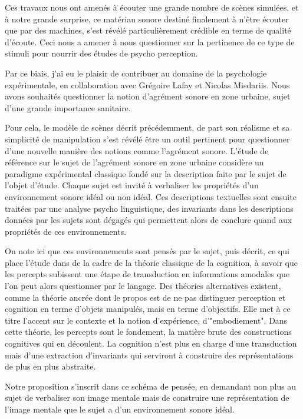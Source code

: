   Ces travaux nous ont amenés à écouter une grande nombre de scènes simulées, et à notre grande surprise, ce matériau sonore destiné finalement à n'être écouter que par des machines, s'est révélé particulièrement crédible en terme de qualité d'écoute. Ceci nous a amener à nous questionner sur la pertinence de ce type de stimuli pour nourrir des études de psycho perception.

  Par ce biais, j'ai eu le plaisir de contribuer au domaine de la psychologie expérimentale, en collaboration avec Grégoire Lafay et Nicolas Misdariis. Nous avons souhaités questionner la notion d'agrément sonore en zone urbaine, sujet d'une grande importance sanitaire.

  Pour cela, le modèle de scènes décrit précédemment, de part son réalisme et sa simplicité de manipulation s'est révélé être un outil pertinent pour questionner d'une nouvelle manière des notions comme l'agrément sonore. L'étude de référence sur le sujet de l'agrément sonore en zone urbaine\cite{guastavino2006ideal} considère un paradigme expérimental classique fondé sur la description faite par le sujet de l'objet d'étude. Chaque sujet est invité à verbaliser les propriétés d'un environnement sonore idéal ou non idéal. Ces descriptions textuelles sont ensuite traitées par une analyse psycho linguistique, des invariants dans les descriptions données par les sujets sont dégagés qui permettent alors de conclure quand aux propriétés de ces environnements.

  On note ici que ces environnements sont pensés par le sujet, puis décrit, ce qui place l'étude dans de la cadre de la théorie classique de la cognition, à savoir que les percepts subissent une étape de transduction en informations amodales que l'on peut alors questionner par le langage. Des théories alternatives existent, comme la théorie ancrée\cite{barsalou2010grounded} dont le propos est de ne pas distinguer perception et cognition en terme d'objets manipulés, mais en terme d'objectifs. Elle met à ce titre l'accent sur le contexte et la notion d'expérience, d'"embodiement". Dans cette théorie, les percepts sont le fondement, la matière brute des constructions cognitives qui en découlent. La cognition n'est plus en charge d'une transduction mais d'une extraction d'invariants qui serviront à construire des représentations de plus en plus abstraite.

  Notre proposition s'inscrit dans ce schéma de pensée, en demandant non plus au sujet de verbaliser son image mentale mais de \og construire \fg une représentation de l'image mentale que le sujet a d'un environnement sonore idéal.


